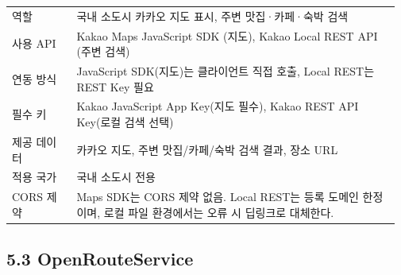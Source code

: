 \documentclass[12pt,a4paper]{article}
\newcommand{\DocNeedspace}[1]{\par\ifdim\dimexpr\pagegoal-\pagetotal\relax<#1\newpage\fi}
\renewcommand{\arraystretch}{1.35}
\begin{document}
\DocNeedspace{20\baselineskip}
\begin{small}
\setlength{\tabcolsep}{3pt}
\setlength{\extrarowheight}{1pt}
\renewcommand{\arraystretch}{1.42}
\begin{longtable}{@{}>{\centering\arraybackslash}m{0.165\linewidth}>{\RaggedRight\arraybackslash}m{0.807\linewidth}@{}}
\toprule
\multicolumn{1}{>{\centering\arraybackslash}m{0.165\linewidth}}{\textbf{항목}} & \multicolumn{1}{>{\centering\arraybackslash}m{0.807\linewidth}}{\textbf{내용}} \\
\midrule
\endhead
역할 & 국내 소도시 카카오 지도 표시, 주변 맛집·카페·숙박 검색 \\
사용 API & Kakao Maps JavaScript SDK (지도), Kakao Local REST API (주변 검색) \\
연동 방식 & JavaScript SDK(지도)는 클라이언트 직접 호출, Local REST는 REST Key 필요 \\
필수 키 & Kakao JavaScript App Key(지도 필수), Kakao REST API Key(로컬 검색 선택) \\
제공 데이터 & 카카오 지도, 주변 맛집/카페/숙박 검색 결과, 장소 URL \\
적용 국가 & 국내 소도시 전용 \\
CORS 제약 & Maps SDK는 CORS 제약 없음. Local REST는 등록 도메인 한정이며, 로컬 파일 환경에서는 오류 시 딥링크로 대체한다. \\
\bottomrule
\end{longtable}
\end{small}


\DocNeedspace{24\baselineskip}
\subsection*{5.3 OpenRouteService}
\end{document}
